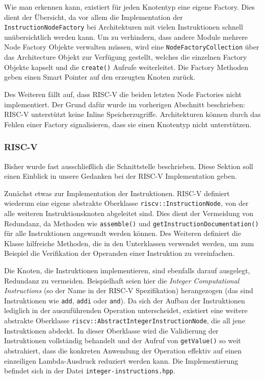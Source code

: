 Wie man erkennen kann, existiert für jeden Knotentyp eine eigene Factory. Dies
dient der Übersicht, da vor allem die Implementation der
\texttt{InstructionNodeFactory} bei Architekturen mit vielen Instruktionen
schnell unübersichtlich werden kann. Um zu verhindern, dass andere Module
mehrere Node Factory Objekte verwalten müssen, wird eine
\texttt{NodeFactoryCollection} über das Architecture Objekt zur Verfügung
gestellt, welches die einzelnen Factory Objekte kapselt und die
\texttt{create()} Aufrufe weiterleitet. Die Factory Methoden geben einen Smart
Pointer auf den erzeugten Knoten zurück.

Des Weiteren fällt auf, dass RISC-V die beiden letzten Node Factories nicht
implementiert. Der Grund dafür wurde im vorherigen Abschnitt beschrieben:
RISC-V unterstützt keine Inline Speicherzugriffe. Architekturen können durch das
Fehlen einer Factory signalisieren, dass sie einen Knotentyp nicht unterstützen.

\subsubsection{RISC-V}

Bisher wurde fast ausschließlich die Schnittstelle beschrieben. Diese Sektion
soll einen Einblick in unsere Gedanken bei der RISC-V Implementation geben.

Zunächst etwas zur Implementation der Instruktionen. RISC-V definiert wiederum
eine eigene abstrakte Oberklasse \texttt{riscv::InstructionNode}, von der alle
weiteren Instruktionsknoten abgeleitet sind. Dies dient der Vermeidung von
Redundanz, da Methoden wie \texttt{assemble()} und
\texttt{getInstructionDocumentation()} für alle Instruktionen angewandt werden
können. Des Weiteren definiert die Klasse hilfreiche Methoden, die in den
Unterklassen verwendet werden, um zum Beispiel die Verifikation der Operanden
einer Instruktion zu vereinfachen.

Die Knoten, die Instruktionen implementieren, sind ebenfalls darauf ausgelegt,
Redundanz zu vermeiden. Beispielhaft seien hier die \emph{Integer Computational
Instructions} (so der Name in der RISC-V Spezifikation) herangezogen (das sind
Instruktionen wie \texttt{add}, \texttt{addi} oder \texttt{and}). Da sich der
Aufbau der Instruktionen lediglich in der auszuführenden Operation
unterscheidet, existiert eine weitere abstrakte Oberklasse
\texttt{riscv::AbstractIntegerInstructionNode}, die all jene Instruktionen
abdeckt. In dieser Oberklasse wird die Validierung der Instruktionen vollständig
behandelt und der Aufruf von \texttt{getValue()} so weit abstrahiert, dass die
konkreten Anwendung der Operation effektiv auf einen einzeiligen Lambda-Ausdruck
reduziert werden kann. Die Implementierung befindet sich in der Datei
\texttt{integer-instructions.hpp}.

